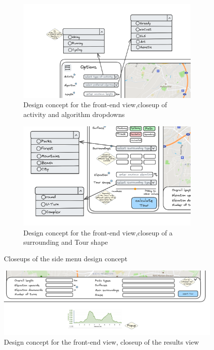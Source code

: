 \begin{figure}[H]
	\begin{subfigure}[t]{0.8\linewidth}
		\centering
		\includegraphics[width=\linewidth]{bilder/Concept closeup activity, algorithm.png}
		\caption{Design concept for the front-end view,closeup of activity and algorithm dropdowns}
		\label{fig:frontendConceptCloseupDropdowns}	
	\end{subfigure}
	\hfill
	\begin{subfigure}[t]{0.8\linewidth}
		\centering
		\includegraphics[width=\linewidth]{bilder/Concept closeup surroundings, tour shape.png}
		\caption{Design concept for the front-end view,closeup of a surrounding and Tour shape}
		\label{fig:frontendConceptCloseupButtons}		
	\end{subfigure}
	\caption{Closeups of the side menu design concept}
	\label{fig:frontendSideMenuCloseups}
\end{figure}



\begin{figure}[H]
	\centering
	\includegraphics[width=0.9\linewidth]{bilder/Concept closeup tour stats, elevation profile.png}
	\caption{Design concept for the front-end view, closeup of the results view}
	\label{fig:frontendConceptResultsCloseup}
\end{figure}


